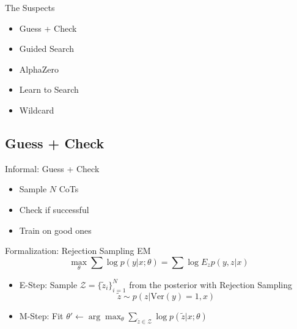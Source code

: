 \documentclass[14pt,aspectratio=169]{beamer}
\begin{document}
\begin{frame}{The Suspects}
	\begin{itemize}
		\item Guess + Check
		\item Guided Search
		\item AlphaZero
		\item Learn to Search
		\item Wildcard
	\end{itemize}
\end{frame}



\subsection{Guess + Check}

\begin{frame}{Informal: Guess + Check}
	\begin{itemize}
		\item Sample $N$ CoTs
		\item Check if successful
		\item Train on good ones
	\end{itemize}
\end{frame}

\begin{frame}{Formalization: Rejection Sampling EM}
	$$\max_{\theta} \sum \log p(y | x; \theta) = \sum \log E_{z} p(y, z | x)$$
	\begin{itemize}
		\item E-Step: Sample $\mathcal{Z} = \{\tilde{z}_i\}_{i=1}^{N}$ from the posterior with Rejection Sampling
		\[ \tilde{z} \sim p(z | \text{Ver}(y)=1, x) \]
		\item M-Step: Fit $\theta' \gets \arg\max_{\theta}
			      \sum_{\tilde{z} \in \mathcal{Z}} \log p(\tilde{z} | x;\theta)$
	\end{itemize}
\end{frame}
\end{document}
